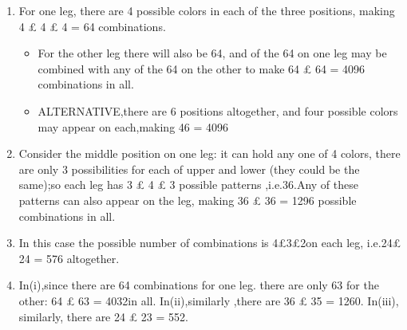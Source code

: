\documentclass[a4paper,12pt]{article}
\begin{document}
\begin{enumerate}
\item  For one leg, there are 4 possible colors in each of the three positions, making
4 £ 4 £ 4 = 64 combinations.
\begin{itemize}
\item For the other leg there will also be 64, and of the 64
on one leg may be combined with any of the 64 on the other to make 64 £ 64 = 4096
combinations in all.
\item ALTERNATIVE,there are 6 positions altogether, and four possible colors may appear
on each,making 46 = 4096
\end{itemize}
\item Consider the middle position on one leg: it can hold any one of 4 colors, there
are only 3 possibilities for each of upper and lower (they could be the same);so each leg
has 3 £ 4 £ 3 possible patterns ,i.e.36.Any of these patterns can also appear on the leg,
making 36 £ 36 = 1296 possible combinations in all.
\item In this case the possible number of combinations is 4£3£2on each leg, i.e.24£
24 = 576 altogether.
\item In(i),since there are 64 combinations for one leg. there are only 63 for the other:
64 £ 63 = 4032in all.
In(ii),similarly ,there are 36 £ 35 = 1260.
In(iii), similarly, there are 24 £ 23 = 552.
\end{enumerate}
\end{document}
